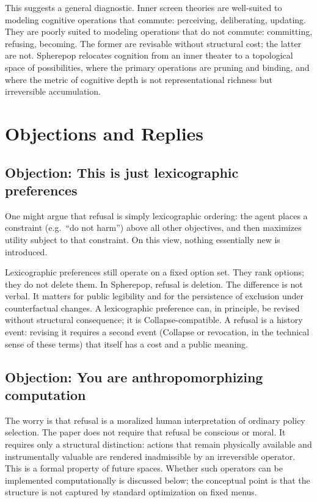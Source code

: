 \documentclass[11pt]{article}
\begin{document}
This suggests a general diagnostic. Inner screen theories are well-suited to
modeling cognitive operations that commute: perceiving, deliberating, updating.
They are poorly suited to modeling operations that do not commute: committing,
refusing, becoming. The former are revisable without structural cost; the latter
are not. Spherepop relocates cognition from an inner theater to a topological
space of possibilities, where the primary operations are pruning and binding, and
where the metric of cognitive depth is not representational richness but
irreversible accumulation.

\section{Objections and Replies}
\label{sec:obj}

\subsection{Objection: This is just lexicographic preferences}

One might argue that refusal is simply lexicographic ordering: the agent places
a constraint (e.g.\ ``do not harm'') above all other objectives, and then
maximizes utility subject to that constraint. On this view, nothing essentially
new is introduced.

Lexicographic preferences still operate on a fixed option set. They rank
options; they do not delete them. In Spherepop, refusal is deletion. The
difference is not verbal. It matters for public legibility and for the
persistence of exclusion under counterfactual changes. A lexicographic
preference can, in principle, be revised without structural consequence; it is
Collapse-compatible. A refusal is a history event: revising it requires a second
event (Collapse or revocation, in the technical sense of these terms) that itself
has a cost and a public meaning.

\subsection{Objection: You are anthropomorphizing computation}

The worry is that refusal is a moralized human interpretation of ordinary
policy selection. The paper does not require that refusal be conscious or moral.
It requires only a structural distinction: actions that remain physically
available and instrumentally valuable are rendered inadmissible by an
irreversible operator. This is a formal property of future spaces. Whether such
operators can be implemented computationally is discussed below; the conceptual
point is that the structure is not captured by standard optimization on fixed
menus.
\end{document}
